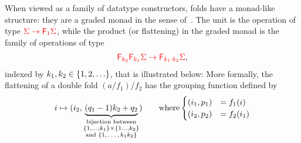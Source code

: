 When viewed as a family of datatype constructors,  folds have a monad-like structure: they are a graded  monad in the sense of~\cite[p. 518]{fujiShinyaMellies2016}. The unit is the operation 
of type ${\color{red}{\Sigma \to {\color{red}{\mathsf F_{1}}}\Sigma}}$, while  the product (or flattening) in the graded monad is the family of operations of type 
\begin{align*}
    {\color{red}{{\color{red}{\mathsf F_{k_2}}}{\color{red}{\mathsf F_{k_1}}}\Sigma \to {\color{red}{\mathsf F_{k_1 \cdot k_2}}}\Sigma}},
\end{align*}
indexed by $k_1,k_2 \in \{1,2,\ldots\}$, that is illustrated below:
More formally, the flattening of a double fold $(a/{f_1})/{f_2}$ has the grouping function defined by
\begin{align*}
i \mapsto (i_2, \underbrace{(q_1 -1)k_2 + q_2}_{\substack{\text{bijection between} \\ \{1,\ldots,k_1\} \times \{1\ldots,k_2\} \\ \text{and $\{1,\ldots,k_1k_2\}$}}}) \qquad \text{where} \begin{cases}
    (i_1,p_1) &= f_1(i)\\
    (i_2,p_2) &= f_2(i_1)
\end{cases}
\end{align*}



 

